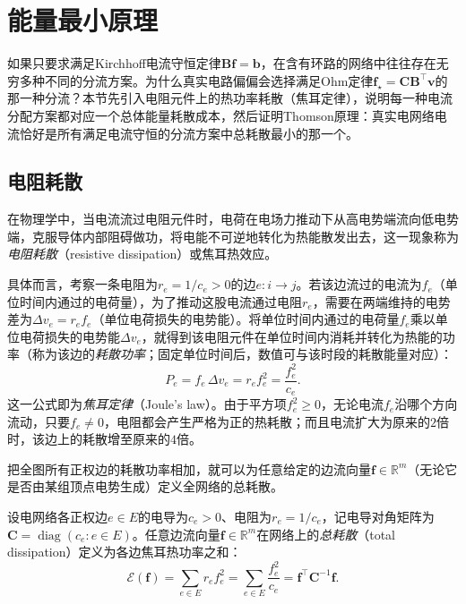 \section{能量最小原理}
\label{sec:electrical-minimum-energy}

如果只要求满足Kirchhoff电流守恒定律$\bm B\bm f=\bm b$，在含有环路的网络中往往存在无穷多种不同的分流方案。为什么真实电路偏偏会选择满足Ohm定律$\bm f_\star=\bm C\bm B^\top\bm v$的那一种分流？本节先引入电阻元件上的热功率耗散（焦耳定律），说明每一种电流分配方案都对应一个总体能量耗散成本，然后证明Thomson原理：真实电网络电流恰好是所有满足电流守恒的分流方案中总耗散最小的那一个。

\subsection{电阻耗散}
\label{sec:electrical-dissipation-definition}

在物理学中，当电流流过电阻元件时，电荷在电场力推动下从高电势端流向低电势端，克服导体内部阻碍做功，将电能不可逆地转化为热能散发出去，这一现象称为\emph{电阻耗散}（resistive dissipation）或焦耳热效应。

具体而言，考察一条电阻为$r_e = 1/c_e > 0$的边$e\colon i\to j$。若该边流过的电流为$f_e$（单位时间内通过的电荷量），为了推动这股电流通过电阻$r_e$，需要在两端维持的电势差为$\Delta v_e = r_e f_e$（单位电荷损失的电势能）。将单位时间内通过的电荷量$f_e$乘以单位电荷损失的电势能$\Delta v_e$，就得到该电阻元件在单位时间内消耗并转化为热能的功率（称为该边的\emph{耗散功率}；固定单位时间后，数值可与该时段的耗散能量对应）：
\[
  P_e = f_e\,\Delta v_e = r_e f_e^2 = \frac{f_e^2}{c_e}.
\]
这一公式即为\emph{焦耳定律}（Joule's law）。由于平方项$f_e^2\geq 0$，无论电流$f_e$沿哪个方向流动，只要$f_e\neq 0$，电阻都会产生严格为正的热耗散；而且电流扩大为原来的$2$倍时，该边上的耗散增至原来的$4$倍。

把全图所有正权边的耗散功率相加，就可以为任意给定的边流向量$\bm f\in\mathbb R^m$（无论它是否由某组顶点电势生成）定义全网络的总耗散。

\begin{definition}[电网络流的总耗散]
\label{def:electrical-dissipation}
设电网络各正权边$e\in E$的电导为$c_e>0$、电阻为$r_e=1/c_e$，记电导对角矩阵为$\bm C=\operatorname{diag}(c_e\colon e\in E)$。任意边流向量$\bm f\in\mathbb R^m$在网络上的\emph{总耗散}（total dissipation）定义为各边焦耳热功率之和：
\begin{equation}
  \mathcal E(\bm f)
  = \sum_{e\in E} r_e f_e^2
  = \sum_{e\in E} \frac{f_e^2}{c_e}
  = \bm f^\top \bm C^{-1} \bm f.
  \label{eq:electrical-dissipation}
\end{equation}
\end{definition}

